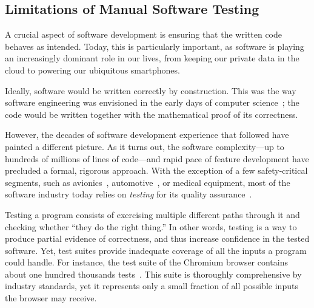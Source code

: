 \subsection{Limitations of Manual Software Testing}

A crucial aspect of software development is ensuring that the written code behaves as intended.  Today, this is particularly important, as software is playing an increasingly dominant role in our lives, from keeping our private data in the cloud to powering our ubiquitous smartphones.

Ideally, software would be written correctly by construction.  This was the way software engineering was envisioned in the early days of computer science~\cite{dijkstra1976discipline}; the code would be written together with the mathematical proof of its correctness.

However, the decades of software development experience that followed have painted a different picture.  As it turns out, the software complexity---up to hundreds of millions of lines of code---and rapid pace of feature development have precluded a formal, rigorous approach.
%
With the exception of a few safety-critical segments, such as avionics~\cite{Astree}, automotive~\cite{automotive}, or medical equipment, most of the software industry today relies on \emph{testing} for its quality assurance~\cite{softwareMetrics}.




Testing a program consists of exercising multiple different paths through it and checking whether ``they do the right thing.''
%
In other words, testing is a way to produce partial evidence of correctness, and thus increase confidence in the tested software.
%
Yet, test suites provide inadequate coverage of all the inputs a program could handle.
%
For instance, the test suite of the Chromium browser contains about one hundred thousands tests~\cite{chrome-tests}.  This suite is thoroughly comprehensive by industry standards, yet it represents only a small fraction of all possible inputs the browser may receive.

